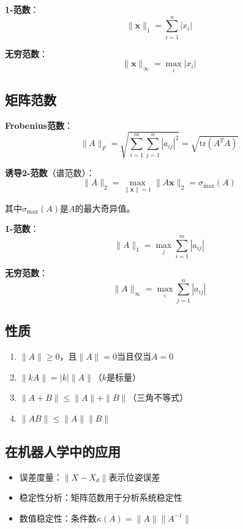 \documentclass[12pt,a4paper]{article}
\begin{document}
\textbf{1-范数}：
\begin{equation}
\|\bm{x}\|_1 = \sum_{i=1}^n |x_i|
\end{equation}

\textbf{无穷范数}：
\begin{equation}
\|\bm{x}\|_\infty = \max_i |x_i|
\end{equation}

\subsection{矩阵范数}

\textbf{Frobenius范数}：
\begin{equation}
\|A\|_F = \sqrt{\sum_{i=1}^m \sum_{j=1}^n |a_{ij}|^2} = \sqrt{\text{tr}(A^T A)}
\end{equation}

\textbf{诱导2-范数}（谱范数）：
\begin{equation}
\|A\|_2 = \max_{\|\bm{x}\|=1} \|A\bm{x}\|_2 = \sigma_{\max}(A)
\end{equation}

其中$\sigma_{\max}(A)$是$A$的最大奇异值。

\textbf{1-范数}：
\begin{equation}
\|A\|_1 = \max_j \sum_{i=1}^m |a_{ij}|
\end{equation}

\textbf{无穷范数}：
\begin{equation}
\|A\|_\infty = \max_i \sum_{j=1}^n |a_{ij}|
\end{equation}

\subsection{性质}

\begin{enumerate}
\item $\|A\| \geq 0$，且$\|A\| = 0$当且仅当$A = 0$
\item $\|kA\| = |k| \|A\|$（$k$是标量）
\item $\|A + B\| \leq \|A\| + \|B\|$（三角不等式）
\item $\|AB\| \leq \|A\| \|B\|$
\end{enumerate}

\subsection{在机器人学中的应用}

\begin{itemize}
\item 误差度量：$\|X - X_d\|$表示位姿误差
\item 稳定性分析：矩阵范数用于分析系统稳定性
\item 数值稳定性：条件数$\kappa(A) = \|A\| \|A^{-1}\|$
\end{itemize}
\end{document}
